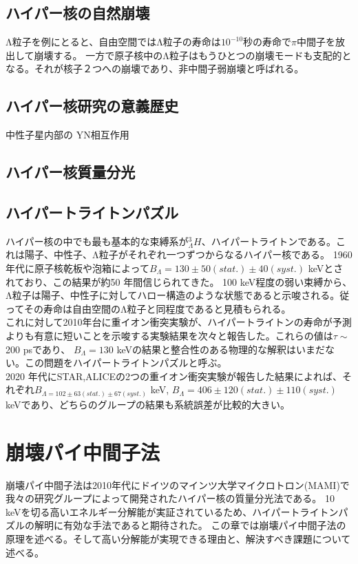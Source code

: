 \documentclass[a4paper,11pt,uplatex]{jsarticle}
\begin{document}
\subsection{ハイパー核の自然崩壊}
Λ粒子を例にとると、自由空間ではΛ粒子の寿命は$10^{-10}$秒の寿命で$\pi$中間子を放出して崩壊する。
一方で原子核中のΛ粒子はもうひとつの崩壊モードも支配的となる。それが核子２つへの崩壊であり、非中間子弱崩壊と呼ばれる。
\subsection{ハイパー核研究の意義歴史}
中性子星内部の YN相互作用
\subsection{ハイパー核質量分光}
\subsection{ハイパートライトンパズル}
ハイパー核の中でも最も基本的な束縛系が$^3_{\Lambda}H$、ハイパートライトンである。これは陽子、中性子、Λ粒子がそれぞれ一つずつからなるハイパー核である。
1960年代に原子核乾板や泡箱によって$B_{\Lambda} = 130 \pm 50(stat.) \pm 40(syst.)$ keVとされており、この結果が約50 年間信じられてきた。
100 keV程度の弱い束縛から、Λ粒子は陽子、中性子に対してハロー構造のような状態であると示唆される。従ってその寿命は自由空間のΛ粒子と同程度であると見積もられる。\\
これに対して2010年台に重イオン衝突実験が、ハイパートライトンの寿命が予測よりも有意に短いことを示唆する実験結果を次々と報告した。これらの値は$\tau \sim$200 psであり、
$B_{\Lambda} = 130$ keVの結果と整合性のある物理的な解釈はいまだない。この問題をハイパートライトンパズルと呼ぶ。\\
2020 年代にSTAR,ALICEの2つの重イオン衝突実験が報告した結果によれば、それぞれ$B_{\Lambda= 102 \pm 63(stat.) \pm 67(syst.)}$ keV, 
$B_{\Lambda} = 406 \pm 120(stat.) \pm 110 (syst.)$ keVであり、どちらのグループの結果も系統誤差が比較的大きい。

\section{崩壊パイ中間子法}
崩壊パイ中間子法は2010年代にドイツのマインツ大学マイクロトロン(MAMI)で我々の研究グループによって開発されたハイパー核の質量分光法である。
10 keVを切る高いエネルギー分解能が実証されているため、ハイパートライトンパズルの解明に有効な手法であると期待された。
この章では崩壊パイ中間子法の原理を述べる。そして高い分解能が実現できる理由と、解決すべき課題について述べる。
\end{document}
